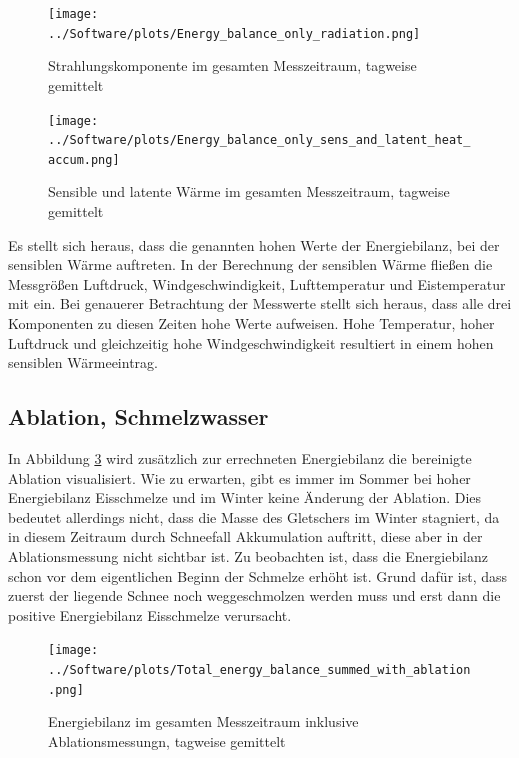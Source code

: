 \documentclass[12pt,a4paper]{article}
\begin{document}
\begin{figure}[H]
\centering
\texttt{[image: ../Software/plots/Energy\_balance\_only\_radiation.png]}
\caption{Strahlungskomponente im gesamten Messzeitraum, tagweise gemittelt}
\label{fig:Nettostrahlung (SW und LW) im gesamten Messzeitraum}
\end{figure}

\begin{figure}[H]
\centering
\texttt{[image: ../Software/plots/Energy\_balance\_only\_sens\_and\_latent\_heat\_accum.png]}
\caption{Sensible und latente Wärme im gesamten Messzeitraum, tagweise gemittelt}
\label{fig:Sensible und latente Wärme im gesamten Messzeitraum}
\end{figure}

Es stellt sich heraus, dass die genannten hohen Werte der Energiebilanz, bei der sensiblen Wärme auftreten. In der Berechnung der sensiblen Wärme fließen die Messgrößen Luftdruck, Windgeschwindigkeit, Lufttemperatur und Eistemperatur mit ein. Bei genauerer Betrachtung der Messwerte stellt sich heraus, dass alle drei Komponenten zu diesen Zeiten hohe Werte aufweisen. Hohe Temperatur, hoher Luftdruck und gleichzeitig hohe Windgeschwindigkeit resultiert in einem hohen sensiblen Wärmeeintrag. 


\subsection{Ablation, Schmelzwasser}
In Abbildung \ref{fig:Energiebilanz im gesamten Messzeitraum inklusive Ablationsmessung} wird zusätzlich zur errechneten Energiebilanz die bereinigte Ablation visualisiert. Wie zu erwarten, gibt es immer im Sommer bei hoher Energiebilanz Eisschmelze und im Winter keine Änderung der Ablation. Dies bedeutet allerdings nicht, dass die Masse des Gletschers im Winter stagniert, da in diesem Zeitraum durch Schneefall Akkumulation auftritt, diese aber in der Ablationsmessung nicht sichtbar ist. Zu beobachten ist, dass die Energiebilanz schon vor dem eigentlichen Beginn der Schmelze erhöht ist. Grund dafür ist, dass zuerst der liegende Schnee noch weggeschmolzen werden muss und erst dann die positive Energiebilanz Eisschmelze verursacht.


\begin{figure}[H]
\centering
\texttt{[image: ../Software/plots/Total\_energy\_balance\_summed\_with\_ablation.png]}
\caption{Energiebilanz im gesamten Messzeitraum inklusive Ablationsmessungn, tagweise gemittelt}
\label{fig:Energiebilanz im gesamten Messzeitraum inklusive Ablationsmessung}
\end{figure}
\end{document}
